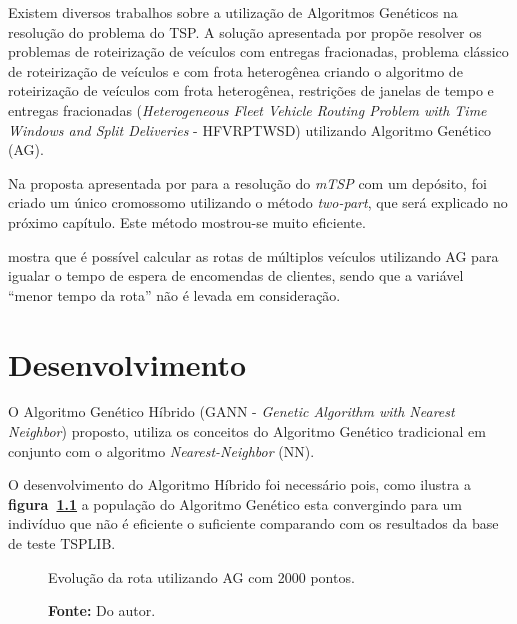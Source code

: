 \documentclass[12pt,openright,a4paper,oneside]{tcc}
\begin{document}
			Existem diversos trabalhos sobre a utilização de Algoritmos Genéticos na resolução do problema do TSP. A solução apresentada por  propõe resolver os problemas de roteirização de 
			veículos com entregas fracionadas, problema clássico de roteirização de veículos e com 
			frota heterogênea criando o algoritmo de roteirização de veículos com frota heterogênea, 
			restrições de janelas de tempo e entregas fracionadas (\textit{Heterogeneous Fleet Vehicle 
			Routing Problem with Time Windows and Split Deliveries} - HFVRPTWSD) utilizando Algoritmo 
			Genético (AG).

			Na proposta  apresentada por  para a resolução do \textit{mTSP} com um depósito, foi criado um único cromossomo utilizando o método \textit{two-part}, que será explicado no próximo capítulo. Este método mostrou-se muito eficiente.

			  mostra que é possível calcular as rotas de múltiplos veículos utilizando AG para igualar o tempo 
			de espera de encomendas de clientes, sendo que a variável ``menor tempo da rota'' não é levada em consideração.

		
		\chapter{Desenvolvimento}
		
		O Algoritmo Genético Híbrido (GANN - \textit{Genetic Algorithm with Nearest Neighbor}) proposto, utiliza os conceitos do Algoritmo Genético tradicional em conjunto com o algoritmo  \textit{Nearest-Neighbor} (NN).

		O desenvolvimento do Algoritmo Híbrido foi necessário pois, como ilustra a \textbf{figura~\ref{graf-agestag}}  a população do Algoritmo Genético esta convergindo para um indivíduo que não é eficiente o suficiente comparando com os resultados da base de teste TSPLIB.  

		\begin{figure}[h]
			\centering
            \caption{Evolução da rota utilizando AG com 2000 pontos.}
            \caption*{\textbf{Fonte:} Do autor.}
			\label{graf-agestag}
		\end{figure}
\end{document}

